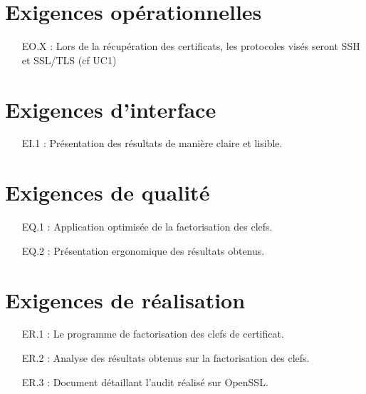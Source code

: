 \documentclass[a4paper,11pt,french]{article}
\begin{document}
\section{Exigences opérationnelles}
\begin{enumerate}
	\item [EO.X] : Lors de la récupération des certificats, les protocoles visés seront SSH et SSL/TLS (cf UC1)
\end{enumerate}


\section{Exigences d'interface}
\begin{enumerate}
	\item [EI.1] : Présentation des résultats de manière claire et lisible.
\end{enumerate}

\section{Exigences de qualité}
\begin{enumerate}
	\item [EQ.1] : Application optimisée de la factorisation des clefs.
	\item [EQ.2] : Présentation ergonomique des résultats obtenus.
\end{enumerate}

\section{Exigences de réalisation}
\begin{enumerate}
	\item [ER.1] : Le programme de factorisation des clefs de certificat.
	\item [ER.2] : Analyse des résultats obtenus sur la factorisation des clefs.
	\item [ER.3] : Document détaillant l'audit réalisé sur OpenSSL.
\end{enumerate}
\end{document}
